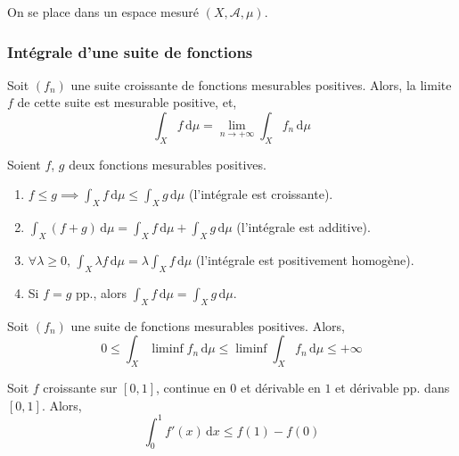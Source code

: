   On se place dans un espace mesuré $(X, \mathcal{A}, \mu)$.

  \subsubsection{Intégrale d'une suite de fonctions}


  \begin{theorem}
    Soit $(f_n)$ une suite croissante de fonctions mesurables positives. Alors, la limite $f$ de cette suite est mesurable positive, et,
    \[ \int_X f \, \mathrm{d}\mu = \lim_{n \rightarrow +\infty} \int_X f_n \, \mathrm{d}\mu \]
  \end{theorem}

  \begin{application}
    Soient $f$, $g$ deux fonctions mesurables positives.
    \begin{enumerate}[label=(\roman*)]
      \item $f \leq g \implies \int_X f \, \mathrm{d}\mu \leq \int_X g \, \mathrm{d}\mu$ (l'intégrale est croissante).
      \item $\int_X (f+g) \, \mathrm{d}\mu = \int_X f \, \mathrm{d}\mu + \int_X g \, \mathrm{d}\mu$ (l'intégrale est additive).
      \item $\forall \lambda \geq 0, \, \int_X \lambda f \, \mathrm{d}\mu = \lambda \int_X f \, \mathrm{d}\mu$ (l'intégrale est positivement homogène).
      \item Si $f = g$ pp., alors $\int_X f \, \mathrm{d}\mu = \int_X g \, \mathrm{d}\mu$.
    \end{enumerate}
  \end{application}


  \begin{theorem}
    Soit $(f_n)$ une suite de fonctions mesurables positives. Alors,
    \[ 0 \leq \int_X \liminf f_n \, \mathrm{d}\mu \leq \liminf \int_X f_n \, \mathrm{d}\mu \leq +\infty \]
  \end{theorem}

  \begin{example}
    \label{235-2}
    Soit $f$ croissante sur $[0,1]$, continue en $0$ et dérivable en $1$ et dérivable pp. dans $[0,1]$. Alors,
    \[ \int_{0}^{1} f'(x) \, \mathrm{d}x \leq f(1) - f(0) \]
  \end{example}


